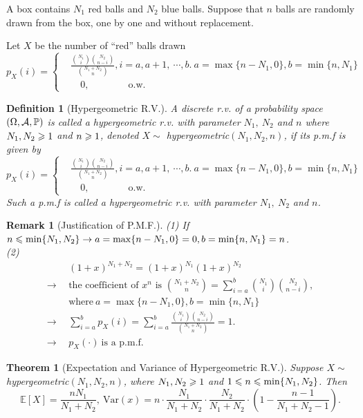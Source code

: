 \documentclass[openany,12pt]{book}
\newtheorem{theorem}{Theorem}[chapter]
\newtheorem{remark}{Remark}[chapter]
\newtheorem{definition}{Definition}[chapter]
\begin{document}
A box contains $N_1$ red balls and $N_2$ blue balls. Suppose that $n$ balls are randomly drawn from the box, one by one and without replacement.

Let $X$ be the number of ``red'' balls drawn
$$
p_X\left(i\right)=
\left\{\begin{aligned}
&\frac{\binom {N_1} i \binom {N_2} {n-i}}{\binom {N_1+N_2} n},i=a,a+1,\ \cdots, b. \ a=\max\{n-N_1,0\},b=\min\{n,N_1\}     \\
&\quad0, \qquad\qquad\text{o.w.}              
\end{aligned}\right.                                                    
$$

\begin{definition}[Hypergeometric R.V.]
A discrete r.v. of a probability space $(\Omega,\mathcal{A},\mathbb{P})$ is called a hypergeometric r.v. with parameter $N_1,\ N_2$ and $n$ where $N_1,N_2\geqslant1$ and $n\geqslant1$, denoted $X\sim$ hypergeometric$(N_1,N_2,n)$, if its p.m.f is given by
$$
p_X\left(i\right)=
\left\{\begin{aligned}
&\frac{\binom {N_1} i \binom {N_2} {n-i}}{\binom {N_1+N_2} n},i=a,a+1,\ \cdots, b. \ a=\max\{n-N_1,0\},b=\min\{n,N_1\}     \\
&\quad0, \qquad\qquad\text{o.w.}              
\end{aligned}\right.                                                    
$$
Such a p.m.f is called a hypergeometric r.v. with parameter $N_1,\ N_2$ and $n$.
\end{definition}

\begin{remark}[Justification of P.M.F.]
(1) If $n\leqslant\min\{N_1,N_2\}\to a=\max\{n-N_1,0\}=0,b=\min\{n,N_1\}=n$.\\
(2) 
$$
\begin{aligned}
&(1+x)^{N_1+N_2}=(1+x)^{N_1}(1+x)^{N_2}\\
\to\ \ &\text{the coefficient of } x^n \text{ is }
\binom{N_1+N_2}{n}=\sum_{i=a}^{b}\binom{N_1}{i}\binom{N_2}{n-i},\\
&\text{where} \ a=\max\{n-N_1,0\},b=\min\{n,N_1\} \\
\to\ &\sum_{i=a}^{b}{p_X\left(i\right)}=\sum_{i=a}^{b}\frac{\binom{N_1}{i}\binom{N_2}{n-i}}{\binom{N_1+N_2}{n}}=1.\\
\to\ &p_X\left(\cdot\right)\ \text{is a p.m.f.}
\end{aligned}
$$
\end{remark}

\begin{theorem}[Expectation and Variance of Hypergeometric R.V.]
Suppose $X\sim$ hypergeometric$(N_1,N_2,n)$, where $N_1,N_2\geqslant1$ and $1\leqslant n\leqslant\min\{N_1,N_2\}$. Then
$$
\mathbb{E}\left[X\right]=\frac{nN_1}{N_1+N_2},\ 
\mathrm{Var}(x)=n\cdot\frac{N_1}{N_1+N_2}\cdot\frac{N_2}{N_1+N_2}\cdot\left(1-\frac{n-1}{N_1+N_2-1}\right).
$$
\end{theorem}
\end{document}
